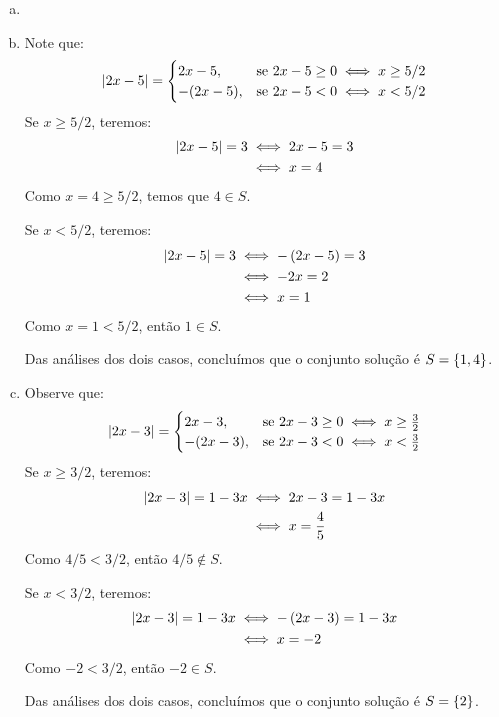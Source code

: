 \begin{solution}
\begin{enumerate}[(a)]
	\item[]
	\item Note que:
	\begin{align*}
		\left|2x-5\right| = 
		\begin{cases}
		2x-5,    & \text{se } 2x-5 \ge 0 \iff x \ge 5/2 \\
		-(2x-5), & \text{se } 2x-5 < 0 \iff x < 5/2
		\end{cases}
	\end{align*}
	Se $x \ge 5/2$, teremos:
	\begin{align*}
	\left|2x-5\right|=3 &\iff 2x-5=3 \\
				  &\iff x=4
	\end{align*}
	Como $x=4\ge5/2$, temos que $4 \in S$.

	Se $x<5/2$, teremos:
	\begin{align*}
		\left|2x-5\right|=3 &\iff -\left(2x-5\right)=3 \\
					  &\iff -2x=2 \\
					  &\iff x=1 
	\end{align*}
	Como $x=1<5/2$, então $1 \in S$.

	Das análises dos dois casos, concluímos que o conjunto solução é $S=\left\{ 1,4\right\}$.

	\item Observe que:
	\begin{align*}
		\left|2x-3\right|= 
		\begin{cases}
			2x-3,    & \text{se } 2x-3 \ge 0 \iff x \ge \frac 3 2 \\
			-(2x-3), & \text{se } 2x-3 < 0 \iff x < \frac 3 2
		\end{cases}
	\end{align*}
	Se $x \ge 3/2$, teremos:
	\begin{align*}
		\left|2x-3\right|=1-3x &\iff 2x-3=1-3x \\
						 &\iff x = \frac 4 5
	\end{align*}
	Como $4/5 < 3/2$, então $4/5 \notin S$.

	Se $x < 3/2$, teremos:
	\begin{align*}
		\left|2x-3\right|=1-3x &\iff -\left(2x-3\right)=1-3x \\
						 &\iff x = -2
	\end{align*}
	Como $-2 < 3/2$, então $-2 \in S$.

	Das análises dos dois casos, concluímos que o conjunto solução é $S=\left\{ 2\right\}$.


\end{enumerate}
\end{solution}
